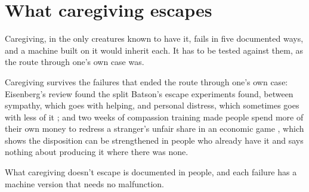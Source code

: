 \section{What caregiving escapes}
\label{sec:20.6}
Caregiving, in the only creatures known to have it, fails in five documented ways, and a machine built on it would inherit each. It has to be tested against them, as the route through one's own case was.

Caregiving survives the failures that ended the route through one's own case: Eisenberg's review found the split Batson's escape experiments found, between sympathy, which goes with helping, and personal distress, which sometimes goes with less of it \autocite{eisenberg1990empathy}; and two weeks of compassion training made people spend more of their own money to redress a stranger's unfair share in an economic game \autocite{weng2013compassion}, which shows the disposition can be strengthened in people who already have it and says nothing about producing it where there was none.

What caregiving doesn't escape is documented in people, and each failure has a machine version that needs no malfunction.
